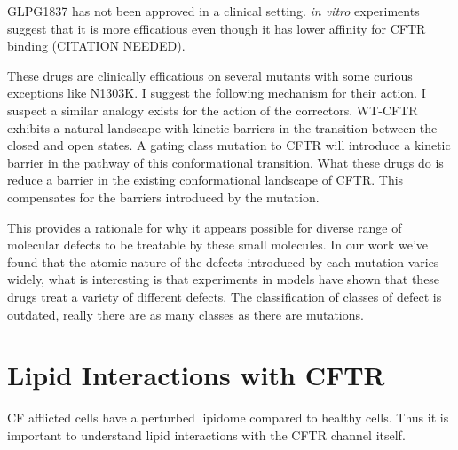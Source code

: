 GLPG1837 has not been approved in a clinical setting. \textit {in vitro} experiments suggest that it is more efficatious even though it has lower affinity for CFTR binding (CITATION NEEDED).  

These drugs are clinically efficatious \cite{VanGoor2014} on several mutants with some curious exceptions like N1303K. I suggest the following mechanism for their action. I suspect a similar analogy exists for the action of the correctors. WT-CFTR exhibits a natural landscape with kinetic barriers in the transition between the closed and open states. A gating class mutation to CFTR will introduce a kinetic barrier in the pathway of this conformational transition. What these drugs do is reduce a barrier in the existing conformational landscape of CFTR. This compensates for the barriers introduced by the mutation. 

This provides a rationale for why it appears possible for diverse range of molecular defects to be treatable by these small molecules. In our work we've found that the atomic nature of the defects introduced by each mutation varies widely, what is interesting is that experiments in  models have shown that these drugs treat a variety of different defects. The classification of classes of defect is outdated, really there are as many classes as there are mutations.



\section{Lipid Interactions with CFTR}
CF afflicted cells have a perturbed lipidome compared to healthy cells.\cite{Cottrill2020} Thus it is important to understand lipid interactions with the CFTR channel itself.
